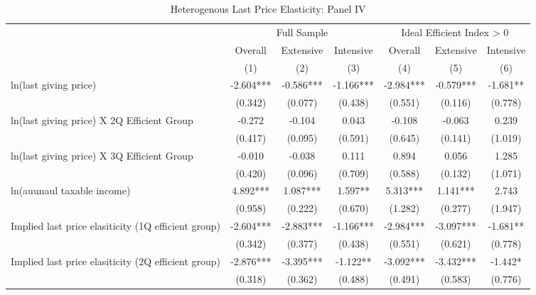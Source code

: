\documentclass[ review  , 3p ]{elsarticle}
\begin{document}
  \begin{table}
  
  \caption{\label{tab:kableHeteroLastElasticity}Heterogenous Last Price Elasticity: Panel IV}
  \centering
  \fontsize{8}{10}\selectfont
  \begin{threeparttable}
  \begin{tabular}[t]{lcccccc}
  \toprule
  \multicolumn{1}{c}{ } & \multicolumn{3}{c}{Full Sample} & \multicolumn{3}{c}{Ideal Efficient Index > 0} \\
  \cmidrule(l{3pt}r{3pt}){2-4} \cmidrule(l{3pt}r{3pt}){5-7}
  \multicolumn{1}{c}{ } & \multicolumn{1}{c}{Overall} & \multicolumn{1}{c}{Extensive} & \multicolumn{1}{c}{Intensive} & \multicolumn{1}{c}{Overall} & \multicolumn{1}{c}{Extensive} & \multicolumn{1}{c}{Intensive} \\
  \cmidrule(l{3pt}r{3pt}){2-2} \cmidrule(l{3pt}r{3pt}){3-3} \cmidrule(l{3pt}r{3pt}){4-4} \cmidrule(l{3pt}r{3pt}){5-5} \cmidrule(l{3pt}r{3pt}){6-6} \cmidrule(l{3pt}r{3pt}){7-7}
   & (1) & (2) & (3) & (4) & (5) & (6)\\
  \midrule
  ln(last giving price) & -2.604*** & -0.586*** & -1.166*** & -2.984*** & -0.579*** & -1.681**\\
   & (0.342) & (0.077) & (0.438) & (0.551) & (0.116) & (0.778)\\
  ln(last giving price) X 2Q Efficient Group & -0.272 & -0.104 & 0.043 & -0.108 & -0.063 & 0.239\\
   & (0.417) & (0.095) & (0.591) & (0.645) & (0.141) & (1.019)\\
  ln(last giving price) X 3Q Efficient Group & -0.010 & -0.038 & 0.111 & 0.894 & 0.056 & 1.285\\
   & (0.420) & (0.096) & (0.709) & (0.588) & (0.132) & (1.071)\\
  ln(auunaul taxable income) & 4.892*** & 1.087*** & 1.597** & 5.313*** & 1.141*** & 2.743\\
   & (0.958) & (0.222) & (0.670) & (1.282) & (0.277) & (1.947)\\
  Implied last price elasiticity (1Q efficient group) & -2.604*** & -2.883*** & -1.166*** & -2.984*** & -3.097*** & -1.681**\\
   & (0.342) & (0.377) & (0.438) & (0.551) & (0.621) & (0.778)\\
  Implied last price elasiticity (2Q efficient group) & -2.876*** & -3.395*** & -1.122** & -3.092*** & -3.432*** & -1.442*\\
   & (0.318) & (0.362) & (0.488) & (0.491) & (0.583) & (0.776)\\

\end{tabular}
\end{threeparttable}
\end{table}
\end{document}
